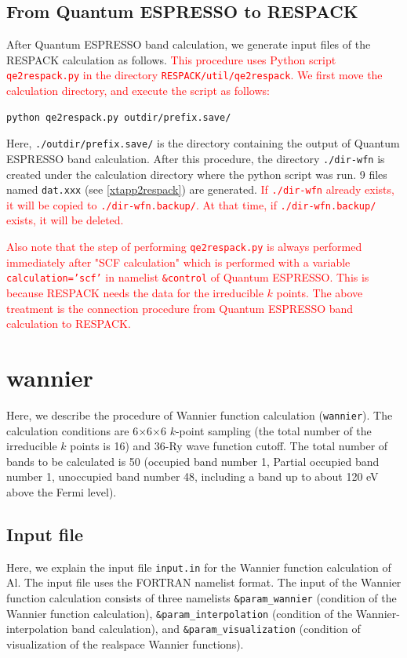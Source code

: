 \documentclass{article}
\newcommand{\tr}[1]{\textcolor{red}{#1}}
\begin{document}
\subsection{From {\sc Quantum ESPRESSO} to RESPACK}

After {\sc Quantum ESPRESSO} band calculation, we generate input files of the RESPACK calculation as follows. 
\tr{This procedure uses Python script {\tt qe2respack.py} in the directory {\tt RESPACK/util/qe2respack}. We first move the calculation directory, and execute the script as follows:}
\begin{verbatim}
python qe2respack.py outdir/prefix.save/
\end{verbatim}
Here, \verb+./outdir/prefix.save/+ is the directory containing the output of {\sc Quantum ESPRESSO} band calculation. After this procedure, the directory {\tt ./dir-wfn} is created under the calculation directory where the python script was run. 9 files named \verb+dat.xxx+ (see \ref{xtapp2respack}) are generated. \tr{If {\tt ./dir-wfn} already exists, it will be copied to {\tt ./dir-wfn.backup/}. At that time, if {\tt ./dir-wfn.backup/} exists, it will be deleted.} 

\tr{Also note that the step of performing {\tt qe2respack.py} is always performed immediately after "SCF calculation" which is performed with a variable {\tt calculation='scf'} in namelist {\tt \&control} of {\sc Quantum ESPRESSO}. This is because RESPACK needs the data for the irreducible $k$ points. The above treatment is the connection procedure from {\sc Quantum ESPRESSO} band calculation to RESPACK.} 

\clearpage 

\section{\label{wannier}wannier}

Here, we describe the procedure of Wannier function calculation (\verb+wannier+). The calculation conditions are 6$\times$6$\times$6 $k$-point sampling (the total number of the irreducible $k$ points is 16) and 36-Ry wave function cutoff. The total number of bands to be calculated is 50 (occupied band number 1, Partial occupied band number 1, unoccupied band number 48, including a band up to about 120 eV above the Fermi level).
\vspace{-3mm}
\subsection{\label{input-wannier}Input file}
Here, we explain the input file \verb+input.in+ for the Wannier function calculation of Al. The input file uses the FORTRAN namelist format. The input of the Wannier function calculation consists of three namelists \verb+&param_wannier+ (condition of the Wannier function calculation), \verb+&param_interpolation+ (condition of the Wannier-interpolation band calculation), and \verb+&param_visualization+ (condition of visualization of the realspace Wannier functions).
\vspace{-3mm}
\end{document}
